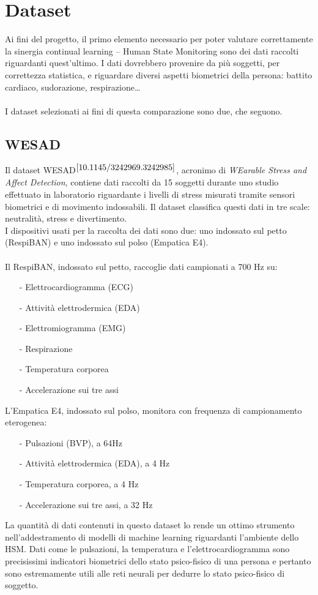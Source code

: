 \chapter{Dataset}
Ai fini del progetto, il primo elemento necessario per poter valutare correttamente la sinergia continual learning -- Human State Monitoring sono dei dati raccolti riguardanti quest'ultimo. I dati dovrebbero provenire da più soggetti, per correttezza statistica, e riguardare diversi aspetti biometrici della persona: battito cardiaco, sudorazione, respirazione\ldots\\\\
I dataset selezionati ai fini di questa comparazione sono due, che seguono.
\section{WESAD}
Il dataset WESAD$^{\cite{10.1145/3242969.3242985}}$, acronimo di \textit{WEarable Stress and Affect Detection}, contiene dati raccolti da 15 soggetti durante uno studio effettuato in laboratorio riguardante i livelli di stress misurati tramite sensori biometrici e di movimento indossabili. Il dataset classifica questi dati in tre scale: neutralità, stress e divertimento.\\
I dispositivi usati per la raccolta dei dati sono due: uno indossato sul petto (RespiBAN) e uno indossato sul polso (Empatica E4).\\\\Il RespiBAN, indossato sul petto, raccoglie dati campionati a 700 Hz su:
\begin{itemize}
    \item[-] Elettrocardiogramma (ECG)
    \item[-] Attività elettrodermica (EDA)
    \item[-] Elettromiogramma (EMG)
    \item[-] Respirazione
    \item[-] Temperatura corporea
    \item[-] Accelerazione sui tre assi
\end{itemize}
L'Empatica E4, indossato sul polso, monitora con frequenza di campionamento eterogenea:
\begin{itemize}
    \item[-] Pulsazioni (BVP), a 64Hz
    \item[-] Attività elettrodermica (EDA), a 4 Hz
    \item[-] Temperatura corporea, a 4 Hz
    \item[-] Accelerazione sui tre assi, a 32 Hz
\end{itemize}
La quantità di dati contenuti in questo dataset lo rende un ottimo strumento nell'addestramento di modelli di machine learning riguardanti l'ambiente dello HSM. Dati come le pulsazioni, la temperatura e l'elettrocardiogramma sono precisissimi indicatori biometrici dello stato psico-fisico di una persona e pertanto sono estremamente utili alle reti neurali per dedurre lo stato psico-fisico di soggetto.
